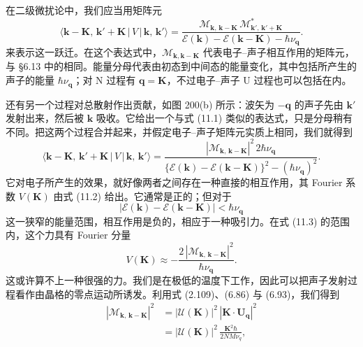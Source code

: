 在二级微扰论中，我们应当用矩阵元
\begin{equation*}
\langle \mathbf{k}-\mathbf{K},\,\mathbf{k}'+\mathbf{K}\,|\,V\,|\,\mathbf{k},\,\mathbf{k}'\rangle
=\frac{\mathcal{M}_{\mathbf{k},\,\mathbf{k}-\mathbf{K}}\,\mathcal{M}^{*}_{\mathbf{k}',\,\mathbf{k}'+\mathbf{K}}}{\mathcal{E}(\mathbf{k})-\mathcal{E}(\mathbf{k}-\mathbf{K})-\hbar\nu_{\mathbf{q}}}.
\tag{11.1}
\end{equation*}
来表示这一跃迁。在这个表达式中，$\mathcal{M}_{\mathbf{k},\mathbf{k}-\mathbf{K}}$ 代表电子–声子相互作用的矩阵元，与 §6.13 中的相同。能量分母代表由初态到中间态的能量变化，其中包括所产生的声子的能量 $\hbar\nu_{\mathbf{q}}$；对 N 过程有 $\mathbf{q}=\mathbf{K}$，不过电子–声子 U 过程也可以包括在内。

还有另一个过程对总散射作出贡献，如图 200(b) 所示：波矢为 $-\mathbf{q}$ 的声子先由 $\mathbf{k}'$ 发射出来，然后被 $\mathbf{k}$ 吸收。它给出一个与式 (11.1) 类似的表达式，只是分母稍有不同。把这两个过程合并起来，并假定电子–声子矩阵元实质上相同，我们就得到
\begin{equation*}
\langle \mathbf{k}-\mathbf{K},\,\mathbf{k}'+\mathbf{K}\,|\,V\,|\,\mathbf{k},\,\mathbf{k}'\rangle
=\frac{|\mathcal{M}_{\mathbf{k},\,\mathbf{k}-\mathbf{K}}|^{2}\,2\hbar\nu_{\mathbf{q}}}{\{\mathcal{E}(\mathbf{k})-\mathcal{E}(\mathbf{k}-\mathbf{K})\}^{2}-(\hbar\nu_{\mathbf{q}})^{2}}.
\tag{11.2}
\end{equation*}
它对电子所产生的效果，就好像两者之间存在一种直接的相互作用，其 Fourier 系数 $V(\mathbf{K})$ 由式 (11.2) 给出。它通常是正的；但对于
\begin{equation*}
|\mathcal{E}(\mathbf{k})-\mathcal{E}(\mathbf{k}-\mathbf{K})|<\hbar\nu_{\mathbf{q}}
\tag{11.3}
\end{equation*}
这一狭窄的能量范围，相互作用是负的，相应于一种吸引力。在式 (11.3) 的范围内，这个力具有 Fourier 分量
\begin{equation*}
V(\mathbf{K})\approx-\frac{2\,|\mathcal{M}_{\mathbf{k},\,\mathbf{k}-\mathbf{K}}|^{2}}{\hbar\nu_{\mathbf{q}}}.
\tag{11.4}
\end{equation*}
这或许算不上一种很强的力。我们是在极低的温度下工作，因此可以把声子发射过程看作由晶格的零点运动所诱发。利用式 (2.109)、(6.86) 与 (6.93)，我们得到
\begin{align*}
|\mathcal{M}_{\mathbf{k},\,\mathbf{k}-\mathbf{K}}|^{2}
&=|\mathcal{U}(\mathbf{K})|^{2}\,|\mathbf{K}\cdot\mathbf{U}_{\mathbf{q}}|^{2}\\
&=|\mathcal{U}(\mathbf{K})|^{2}\,\frac{\mathbf{K}^{2}\hbar}{2NM\nu_{q}},
\tag{11.5}
\end{align*}
